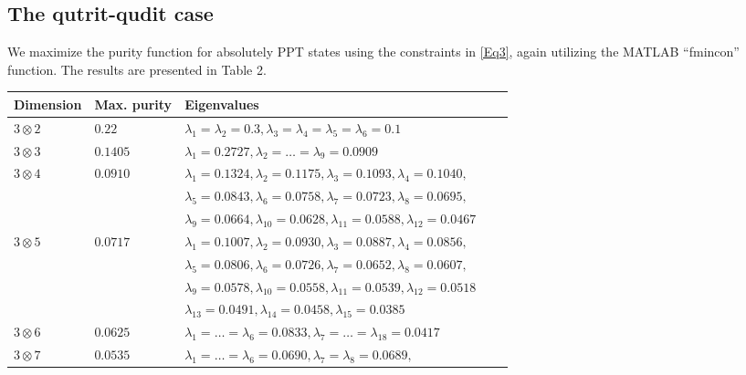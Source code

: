 \documentclass[reqno, 12pt,a4letter]{amsart}
\theoremstyle{definition}
\theoremstyle{plain}
\begin{document}
\subsection{The qutrit-qudit case} 
We maximize the purity function for absolutely PPT states using the constraints in \eqref{Eq3}, again utilizing the MATLAB “fmincon” function. The results are presented in Table 2.
\begin{small}
	\begin{table}\label{table2}
		\begin{tabular}{|l|l|l|l|l|}
			\hline
			Dimension & Max. purity  & Eigenvalues \\ \hline
		  $3 \otimes 2$ & $0.22$   & $\lambda_1 = \lambda_2 = 0.3, \lambda_3 = \lambda_4 = \lambda_5 = \lambda_6 = 0.1$\\  \hline
            $3 \otimes 3$ & $0.1405$   & $\lambda_1=0.2727, \lambda_2 = \dots = \lambda_{9} = 0.0909$           \\ \hline
			
			$3 \otimes 4$ & $0.0910$  &  $\lambda_1=0.1324, \lambda_2=0.1175, \lambda_3 =0.1093, \lambda_4=0.1040,$ \\ 
			
			&   &  $\lambda_5=0.0843, \lambda_6=0.0758, \lambda_7 =0.0723, \lambda_8=0.0695,$ \\
			
			&   &  $\lambda_9=0.0664, \lambda_{10}=0.0628, \lambda_{11} =0.0588, \lambda_{12}=0.0467$ \\ \hline  
			
			$3 \otimes 5$ & $0.0717$  &  $\lambda_1=0.1007, \lambda_2=0.0930, \lambda_3 =0.0887, \lambda_4=0.0856,$ \\ 
			
			&   &  $\lambda_5=0.0806, \lambda_6=0.0726, \lambda_7 =0.0652, \lambda_8=0.0607,$ \\
			
			&   &  $\lambda_9=0.0578, \lambda_{10}=0.0558, \lambda_{11} =0.0539, \lambda_{12}=0.0518$ \\ 
			
			&   &  $\lambda_{13}=0.0491, \lambda_{14}=0.0458, \lambda_{15} =0.0385$ \\ \hline
			
			$3 \otimes 6$ & $0.0625$  &  $\lambda_1=\dots = \lambda_6 = 0.0833, \lambda_7 = \dots = \lambda_{18} = 0.0417$ \\ \hline
			
			$3 \otimes 7$ & $0.0535$  &  $\lambda_1=\dots = \lambda_6 = 0.0690, \lambda_7 = \lambda_{8} = 0.0689,$ \\ 
			

\end{tabular}
\end{table}
\end{small}
\end{document}
